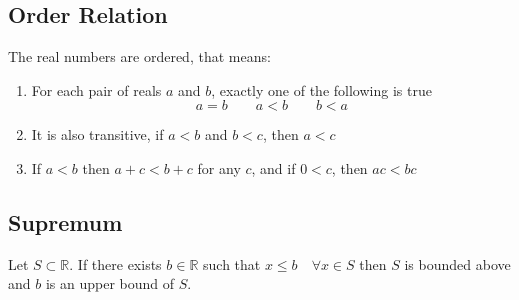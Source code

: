 \documentclass{article}
\newcommand{\R}{\mathbb{R}}
\newcommand{\sub}{\subset}
\begin{document}
\subsection{Order Relation}

The real numbers are {\color{blue}ordered}, that means:
\begin{enumerate}
  \item For each pair of reals $a$ and $b$, exactly one of the following is true
  $$ a = b \qquad a < b \qquad b < a $$
  \item It is also {\color{blue}transitive}, if $a < b$ and $b < c$, then $a < c$
  \item If $a < b$ then $a + c < b + c$ for any $c$, and if $0 < c$, then $ac < bc$
\end{enumerate}

\subsection{Supremum}

Let $S\sub \R$. If there exists $b\in\R$ such that $x \le b \quad\forall x\in S$ then $S$ is {\color{blue}bounded above} and $b$ is an {\color{blue}upper bound of $S$}.
\end{document}
